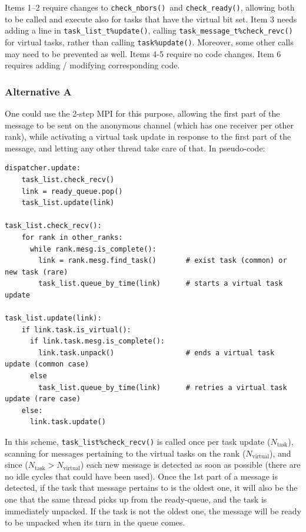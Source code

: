 \documentclass[paper=a4,fontsize=11pt]{scrartcl}
\numberwithin{equation}{section}		%
\numberwithin{figure}{section}			%
\numberwithin{table}{section}				%
\newcommand{\codecolor}{\color{Blue}}
\newcommand{\Code}[1]{{\codecolor\texttt{#1}}}
\def\checkready{\Code{check\_ready()}}
\def\checknbors{\Code{check\_nbors()}}
\begin{document}
Items 1--2 require changes to \checknbors\ and \checkready, allowing both to be called and execute also for tasks that have the virtual bit set.  Item 3 needs adding a line in \Code{task\_list\_t\%update()}, calling  \Code{task\_message\_t\%check\_revc()} for virtual tasks, rather than calling \Code{task\%update()}.  Moreover, some other calls may need to be prevented as well.  Items 4-5 require no code changes.  Item 6 requires adding / modifying corresponding code.

\subsubsection{Alternative A}
One could use the 2-step MPI for this purpose, allowing the first part of the message to be sent on the anonymous channel (which has one receiver per other rank), while activating a virtual task update in response to the first part of the message, and letting any other thread take care of that.  In pseudo-code:
{\codecolor\small\begin{verbatim}
dispatcher.update:
    task_list.check_recv()
    link = ready_queue.pop()
    task_list.update(link)

task_list.check_recv():
    for rank in other_ranks:
      while rank.mesg.is_complete():
        link = rank.mesg.find_task()       # exist task (common) or new task (rare)
        task_list.queue_by_time(link)      # starts a virtual task update

task_list.update(link):
    if link.task.is_virtual():
      if link.task.mesg.is_complete():
        link.task.unpack()                 # ends a virtual task update (common case)
      else
        task_list.queue_by_time(link)      # retries a virtual task update (rare case)
    else:
      link.task.update()
\end{verbatim}}
In this scheme, \Code{task\_list\%check\_recv()} is called once per task update ($N_{\mbox{task}}$), scanning for messages pertaining to the virtual tasks on the rank ($N_{\mbox{virtual}}$), and since ($N_{\mbox{task}} > N_{\mbox{virtual}}$) each new message is detected as soon as possible (there are no idle cycles that could have been used).  Once the 1st part of a message is detected, if the task that message pertains to is the oldest one, it will also be the one that the same thread picks up from the ready-queue, and the task is immediately unpacked.  If the task is not the oldest one, the message will be ready to be unpacked when its turn in the queue comes.
\end{document}
